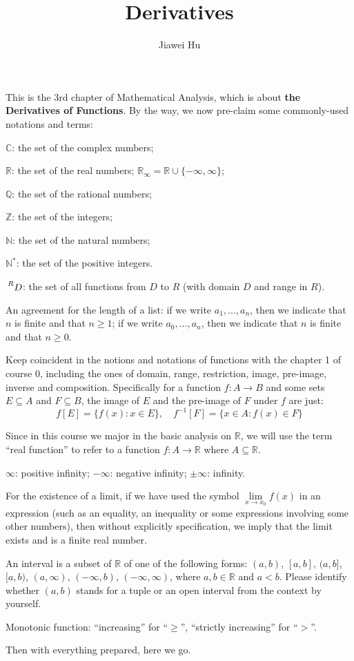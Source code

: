 \documentclass{article}
\title{\LARGE \textbf{Derivatives}}
\author{\large Jiawei Hu}
\begin{document}
\maketitle

This is the 3rd chapter of Mathematical Analysis, which is about \textbf{the Derivatives of Functions}. By the way, we now pre-claim some commonly-used notations and terms:
\begin{compactenum}
    \item $\mathbb{C}$: the set of the complex numbers;
    \item $\mathbb{R}$: the set of the real numbers; $\mathbb{R}_\infty = \mathbb{R}\cup\{-\infty, \infty\}$;
    \item $\mathbb{Q}$: the set of the rational numbers;
    \item $\mathbb{Z}$: the set of the integers;
    \item $\mathbb{N}$: the set of the natural numbers;
    \item $\mathbb{N^\ast}$: the set of the positive integers.
    \item $\sideset{^R}{}{\mathop{D}}$: the set of all functions from $D$ to $R$ (with domain $D$ and range in $R$).
    \item An agreement for the length of a list: if we write $a_1, \dots, a_n$, then we indicate that $n$ is finite and that $n\geq 1$; if we write $a_0, \dots, a_n$, then we indicate that $n$ is finite and that $n\geq 0$.
    \item Keep coincident in the notions and notations of functions with the chapter 1 of course 0, including the ones of domain, range, restriction, image, pre-image, inverse and composition. Specifically for a function $f: A\rightarrow B$ and some sets $E\subseteq A$ and $F\subseteq B$, the image of $E$ and the pre-image of $F$ under $f$ are just:
    $$f[E] = \{f(x): x\in E\},\quad f^{-1}[F] = \{x\in A: f(x)\in F\}$$
    \item Since in this course we major in the basic analysis on $\mathbb{R}$, we will use the term ``real function'' to refer to a function $f: A\rightarrow \mathbb{R}$ where $A\subseteq \mathbb{R}$.
    \item $\infty$: positive infinity; $-\infty$: negative infinity; $\pm\infty$: infinity.
    \item For the existence of a limit, if we have used the symbol $\lim\limits_{x\to x_0} f(x)$ in an expression (such as an equality, an inequality or some expressions involving some other numbers), then without explicitly specification, we imply that the limit exists and is a finite real number.
    \item An interval is a subset of $\mathbb{R}$ of one of the following forms: $(a,b)$, $[a,b]$, $(a,b]$, $[a,b)$, $(a, \infty)$, $(-\infty, b)$, $(-\infty, \infty)$, where $a, b\in\mathbb{R}$ and $a<b$. Please identify whether $(a,b)$ stands for a tuple or an open interval from the context by yourself.
    \item Monotonic function: ``increasing'' for ``$\geq$'', ``strictly increasing'' for ``$>$''.
\end{compactenum} 
Then with everything prepared, here we go.
\end{document}
